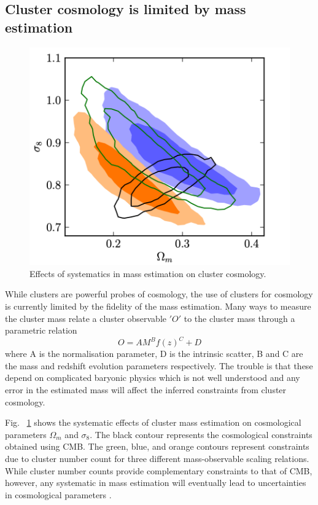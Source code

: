 \subsection{Cluster cosmology is limited by mass estimation}
\begin{figure}[ht]
\includegraphics[width = \columnwidth]{figs/mass_cosmology.png}
\caption{Effects of systematics in mass estimation on cluster cosmology.}
\label{m_cosmo}
\end{figure}
While clusters are powerful probes of cosmology, the use of clusters for cosmology is currently limited by the fidelity of the mass estimation. Many ways to measure the cluster mass relate a cluster observable $'O'$ to the cluster mass through a parametric relation 
\begin{equation}
O = A M^{B} f(z)^{C} +D
\label{obs-mass}
\end{equation} 
where A is the normalisation parameter, D is the intrinsic scatter, B and C are the mass and redshift evolution parameters respectively. The trouble is that these depend on complicated baryonic physics which is not well understood and any error in the estimated mass will affect the inferred constraints from cluster cosmology. 

Fig. ~\ref{m_cosmo} shows the systematic effects of cluster mass estimation on cosmological parameters $\Omega_{m}$ and $\sigma_{8}$. The black contour represents the cosmological constraints obtained using CMB.
The green, blue, and orange contours represent constraints due to cluster number count for three different mass-observable scaling relations.
While cluster number counts provide complementary constraints to that of CMB, however, any systematic in mass estimation will eventually lead to uncertainties in cosmological parameters \citep{hasselfield13}. 


